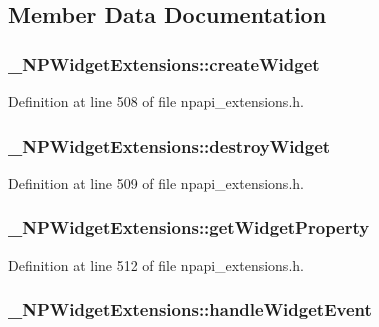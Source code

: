 \subsection{Member Data Documentation}
\hypertarget{struct___n_p_widget_extensions_ab6dda813076e419413bf48db9a22422e}{
\subsubsection[{createWidget}]{ {\bf \_\-NPWidgetExtensions::createWidget}}}
\label{struct___n_p_widget_extensions_ab6dda813076e419413bf48db9a22422e}


Definition at line 508 of file npapi\_\-extensions.h.

\hypertarget{struct___n_p_widget_extensions_a640abaafa2cb5544233a5cbd892c90c0}{
\subsubsection[{destroyWidget}]{ {\bf \_\-NPWidgetExtensions::destroyWidget}}}
\label{struct___n_p_widget_extensions_a640abaafa2cb5544233a5cbd892c90c0}


Definition at line 509 of file npapi\_\-extensions.h.

\hypertarget{struct___n_p_widget_extensions_a8f9e66275fd10db4471a6edb2f9fd6e9}{
\subsubsection[{getWidgetProperty}]{ {\bf \_\-NPWidgetExtensions::getWidgetProperty}}}
\label{struct___n_p_widget_extensions_a8f9e66275fd10db4471a6edb2f9fd6e9}


Definition at line 512 of file npapi\_\-extensions.h.

\hypertarget{struct___n_p_widget_extensions_a2bb38c0a960ee8e8d3d80a77ea77087a}{
\subsubsection[{handleWidgetEvent}]{ {\bf \_\-NPWidgetExtensions::handleWidgetEvent}}}
\label{struct___n_p_widget_extensions_a2bb38c0a960ee8e8d3d80a77ea77087a}



